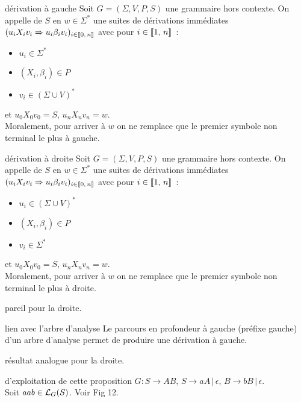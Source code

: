 \begin{adjustwidth}{-3cm}{-3cm}
\begin{definition}{}{dérivation à gauche}
    Soit $G = (\Sigma, V,P,S)$ une grammaire hors contexte. On appelle  de $S$ en $w \in \Sigma^*$ une suites de dérivations immédiates $(u_iX_iv_i \Rightarrow u_i \beta_i v_i)_{i \in \llbracket 0 ,\, n \rrbracket}$ avec pour $i \in \llbracket 1 ,\, n \rrbracket $~:
    \begin{itemize}
        \item $u_i \in \Sigma^*$ 
        \item $(X_i,\beta_i) \in P $
        \item $v_i \in (\Sigma \cup V)^*$
        
    \end{itemize}   
    et $u_0X_0v_0 = S$, $u_nX_nv_n = w$.\\
    Moralement, pour arriver à $w$ on ne remplace que le premier symbole non terminal le plus à gauche.
\end{definition}

\begin{definition}{}{dérivation à droite}
    Soit $G = (\Sigma, V,P,S)$ une grammaire hors contexte. On appelle  de $S$ en $w \in \Sigma^*$ une suites de dérivations immédiates $(u_iX_iv_i \Rightarrow u_i \beta_i v_i)_{i \in \llbracket 0 ,\, n \rrbracket}$ avec pour $i \in \llbracket 1 ,\, n \rrbracket $~:
    \begin{itemize}
        \item $u_i \in (\Sigma \cup V)^*$ 
        \item $(X_i,\beta_i) \in P $
        \item $v_i \in \Sigma^*$
        
    \end{itemize}   
    et $u_0X_0v_0 = S$, $u_nX_nv_n = w$.\\
    Moralement, pour arriver à $w$ on ne remplace que le premier symbole non terminal le plus à droite.
\end{definition}
pareil pour la droite.

\begin{proposition}{}{lien avec l'arbre d'analyse}
    Le parcours en profondeur à gauche (préfixe gauche) d'un arbre d'analyse permet de produire une dérivation à gauche.
\end{proposition}
résultat analogue pour la droite.

\begin{exemple}{}{d'exploitation de cette proposition}
    $G : S \rightarrow AB,\, S \rightarrow aA\,\vert\, \epsilon,\, B \rightarrow bB\,\vert\, \epsilon$.\\
    Soit $aab \in \mathcal{L}_{G}(S)$. Voir Fig 12.
\end{exemple}



\end{adjustwidth}
